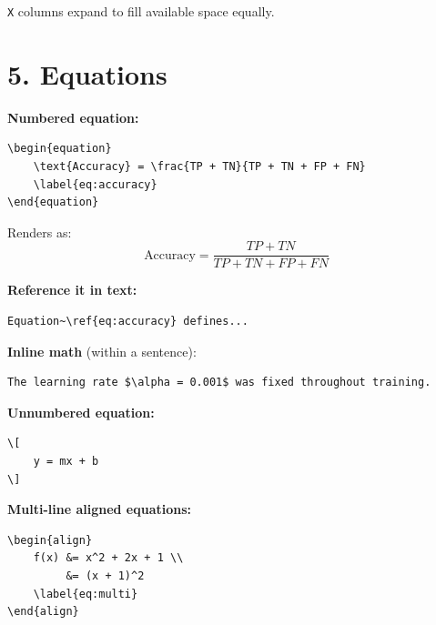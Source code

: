\noindent
\texttt{X} columns expand to fill available space equally.


\section*{5. Equations}

\noindent
\textbf{Numbered equation:}

\begin{verbatim}
\begin{equation}
    \text{Accuracy} = \frac{TP + TN}{TP + TN + FP + FN}
    \label{eq:accuracy}
\end{equation}
\end{verbatim}

\noindent
Renders as:
\begin{equation}
    \text{Accuracy} = \frac{TP + TN}{TP + TN + FP + FN}
    \label{eq:accuracy}
\end{equation}

\noindent
\textbf{Reference it in text:}

\begin{verbatim}
Equation~\ref{eq:accuracy} defines...
\end{verbatim}

\noindent
\textbf{Inline math} (within a sentence):

\begin{verbatim}
The learning rate $\alpha = 0.001$ was fixed throughout training.
\end{verbatim}

\noindent
\textbf{Unnumbered equation:}

\begin{verbatim}
\[
    y = mx + b
\]
\end{verbatim}

\noindent
\textbf{Multi-line aligned equations:}

\begin{verbatim}
\begin{align}
    f(x) &= x^2 + 2x + 1 \\
         &= (x + 1)^2
    \label{eq:multi}
\end{align}
\end{verbatim}

